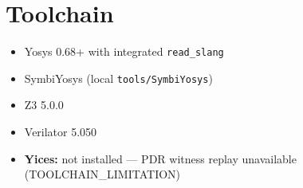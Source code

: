 \section{Toolchain}
\label{app:toolchain}

\begin{itemize}
  \item Yosys 0.68+ with integrated \texttt{read\_slang}
  \item SymbiYosys (local \texttt{tools/SymbiYosys})
  \item Z3 5.0.0
  \item Verilator 5.050
  \item \textbf{Yices:} not installed --- PDR witness replay unavailable (TOOLCHAIN\_LIMITATION)
\end{itemize}

